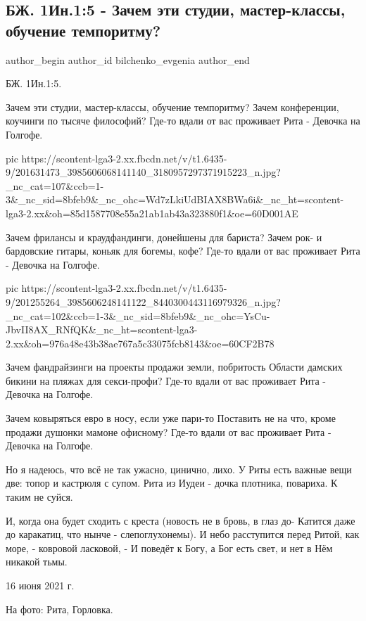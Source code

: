  
 
 
 
 
 
\subsection{БЖ. 1Ин.1:5 - Зачем эти студии, мастер-классы, обучение темпоритму?}
\label{sec:16_06_2021.fb.bilchenko_evgenia.2.devochka_rita_poslanie_ioanna}
\ifcmt
 author_begin
   author_id bilchenko_evgenia
 author_end
\fi

БЖ. 1Ин.1:5.

Зачем эти студии, мастер-классы, обучение темпоритму?
Зачем конференции, коучинги по тысяче философий?
Где-то вдали от вас проживает Рита -
Девочка на Голгофе.

\ifcmt
  pic https://scontent-lga3-2.xx.fbcdn.net/v/t1.6435-9/201631473_3985606068141140_3180957297371915223_n.jpg?_nc_cat=107&ccb=1-3&_nc_sid=8bfeb9&_nc_ohc=Wd7zLkiUdBIAX8BWa6i&_nc_ht=scontent-lga3-2.xx&oh=85d1587708e55a21ab1ab43a323880f1&oe=60D001AE
\fi

Зачем фрилансы и краудфандинги, донейшены для бариста?
Зачем рок- и бардовские гитары, коньяк для богемы, кофе?
Где-то вдали от вас проживает Рита -
Девочка на Голгофе.

\ifcmt
  pic https://scontent-lga3-2.xx.fbcdn.net/v/t1.6435-9/201255264_3985606248141122_8440300443116979326_n.jpg?_nc_cat=102&ccb=1-3&_nc_sid=8bfeb9&_nc_ohc=YsCu-JbvII8AX_RNfQK&_nc_ht=scontent-lga3-2.xx&oh=976a48e43b38ae767a5c33075fcb8143&oe=60CF2B78
\fi

Зачем фандрайзинги на проекты продажи земли, побритость
Области дамских бикини на пляжах для секси-профи?
Где-то вдали от вас проживает Рита - 
Девочка на Голгофе.

Зачем ковыряться евро в носу, если уже пари-то
Поставить не на что, кроме продажи душонки мамоне офисному?
Где-то вдали от вас проживает Рита -
Девочка на Голгофе.

Но я надеюсь, что всё не так ужасно, цинично, лихо.
У Риты есть важные вещи две: топор и кастрюля с супом.
Рита из Иудеи - дочка плотника, повариха.
К таким не суйся.

И, когда она будет сходить с креста (новость не в бровь, в глаз до-
Катится даже до каракатиц, что нынче - слепоглухонемы).
И небо расступится перед Ритой, как море, - ковровой ласковой, -
И поведёт к Богу, а Бог есть свет, и нет в Нём никакой тьмы.

16 июня 2021 г.

На фото: Рита, Горловка.
